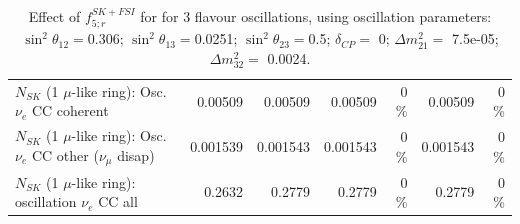 \begin{table}
\begin{tabular}{| l | r | r | r  r | r  r |}
                          $N_{SK}$ (1 $\mu$-like ring): Osc. $\nu_e$ CC coherent &         0.00509 &         0.00509 &         0.00509 &        0 \%  &         0.00509 &        0 \%  \\ 
           $N_{SK}$ (1 $\mu$-like ring): Osc. $\nu_e$ CC other ($\nu_\mu$ disap) &        0.001539 &        0.001543 &        0.001543 &        0 \%  &        0.001543 &        0 \%  \\ 
                        $N_{SK}$ (1 $\mu$-like ring): oscillation $\nu_e$ CC all &          0.2632 &          0.2779 &          0.2779 &        0 \%  &          0.2779 &        0 \%  \\ 
\hline
\hline
\end{tabular}
\caption{ Effect of $f_{5; r}^{SK+FSI}$ for for 3 flavour oscillations, using oscillation parameters:  $\sin^2\theta_{12} = $0.306; $\sin^2\theta_{13} = $0.0251; $\sin^2\theta_{23} = $0.5; $\delta_{CP} = $        0; $\Delta m^2_{21} = $    7.5e-05; $\Delta m^2_{32} = $    0.0024. }
\label{tab:num_skdetfsi_005_1RmuT_3f_osc_t13:0.0251_spectralreco_spectraltrue}
\end{table}
\clearpage
